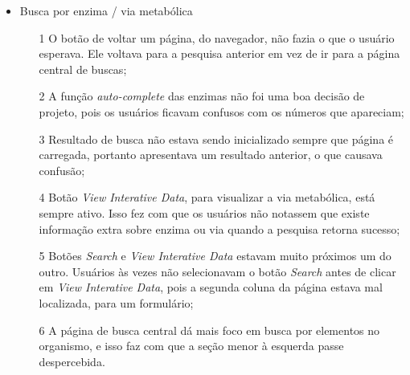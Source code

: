 \begin{itemize}
\item Busca por enzima / via metabólica
  \begin{itemize}
  \item[1] O botão de voltar um página, do navegador, não fazia o que o usuário esperava. Ele voltava para a pesquisa anterior em vez de ir para a página central de buscas;
  \item[2] A função \textit{auto-complete} das enzimas não foi uma boa decisão de projeto, pois os usuários ficavam confusos com os números que apareciam;
  \item[3] Resultado de busca não estava sendo inicializado sempre que página é carregada, portanto apresentava um resultado anterior, o que causava confusão;
  \item[4] Botão \textit{View Interative Data}, para visualizar a via metabólica, está sempre ativo. Isso fez com que os usuários não notassem que existe informação extra sobre enzima ou via quando a pesquisa retorna sucesso;
  \item[5] Botões \textit{Search} e \textit{View Interative Data} estavam muito próximos um do outro. Usuários às vezes não selecionavam o botão \textit{Search} antes de clicar em \textit{View Interative Data}, pois a segunda coluna da página estava mal localizada, para um formulário;
  \item[6] A página de busca central dá mais foco em busca por elementos no organismo, e isso faz com que a seção menor à esquerda passe despercebida.
  \end{itemize}


\end{itemize}
